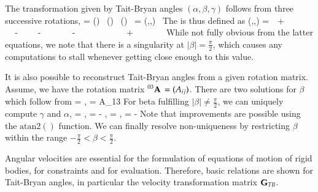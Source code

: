 %
%

\noindent The transformation given by Tait-Bryan angles $(\alpha,\beta,\gamma)$ follows from three successive rotations,
\be
   = (\alpha) \, (\beta) \, (\gamma) \,  \quad
   \quad {} = (\alpha,\beta,\gamma) \, 
\ee
The  is thus defined as
\be
  (\alpha,\beta,\gamma) = \mr{\co\beta \,\co\gamma}{-\co\beta\,\si\gamma}{\si\beta} {\co \alpha \,\si \gamma + \si \alpha \,\si \beta \,\co \gamma}{\co \alpha \,\co\gamma-\si\alpha\,\si\beta\,\si\gamma}{-\si\alpha\,\co\beta} {\si\alpha\,\si\gamma-\co\alpha\,\si\beta\,\co\gamma}{\si\alpha\,\co\gamma+\co\alpha\,\si\beta\,\si\gamma}{\co\alpha\,\co\beta}
\ee
While not fully obvious from the latter equations, we note that there is a singularity at $|\beta| = \frac{\pi}{2}$, which causes any computations to stall whenever getting close enough to this value.

\noindent It is also possible to reconstruct Tait-Bryan angles from a given rotation matrix.
Assume, we have the rotation matrix $\prescript{03}{}{\mathbf{A}}\,=(A_{ij})$.
There are two solutions for $\beta$ which follow from
\be
  \cos \beta = \pm {}, \quad {} \quad \sin \beta = A_{13}
\ee
For beta fulfilling $|\beta| \ne \frac{\pi}{2}$, we can uniquely compute $\gamma$ and $\alpha$,
\be
  \cos \gamma = , \quad \sin \gamma = - , \quad
  \cos \alpha = , \quad {} \quad \sin \alpha = -  \eqDot
\ee
Note that improvements are possible using the $\mathrm{atan2}()$ function.
We can finally resolve non-uniqueness by restricting $\beta$ within the range $-\frac{\pi}{2} < \beta < \frac{\pi}{2}$.

%
Angular velocities are essential for the formulation of equations of motion of rigid bodies, for constraints and for evaluation.
Therefore, basic relations are shown for Tait-Bryan angles, in particular the velocity transformation matrix $\mathbf{G}_{TB}$.

